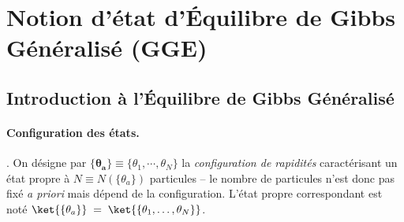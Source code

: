 







\section{Notion d’état d'Équilibre de Gibbs Généralisé (GGE)}

\subsection{Introduction à l'Équilibre de Gibbs Généralisé}


\paragraph{Configuration des états.}\label{sec:config-etats}.
On désigne par $\boldsymbol{\{ \theta_a \}}\equiv \{ \theta_1 , \cdots , \theta_{N} \}$ la \emph{configuration de rapidités} caractérisant un état propre à $N\!\equiv\!N(\{ \theta_a \})$ particules – le nombre de particules n’est donc pas fixé \emph{a priori} mais dépend de la configuration.  
L’état propre correspondant est noté $\ket{\{ \theta_a \}}\;=\;\ket{\{\theta_1,\dots,\theta_N \}}$.

